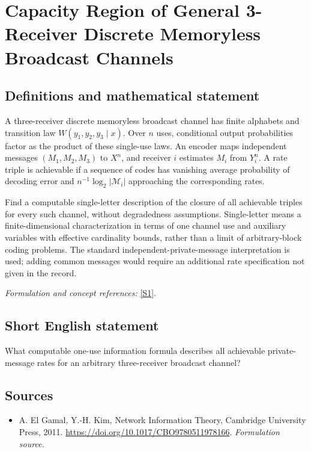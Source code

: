 \documentclass[11pt]{article}
\begin{document}
\section*{\texorpdfstring{Capacity Region of General 3-Receiver Discrete Memoryless Broadcast Channels}{Capacity Region of General 3-Receiver Discrete Memoryless Broadcast Channels}}\label{30006950}
\subsection{Definitions and mathematical statement}
A three-receiver discrete memoryless broadcast channel has finite alphabets and transition law $W(y_1,y_2,y_3\mid x)$. Over $n$ uses, conditional output probabilities factor as the product of these single-use laws. An encoder maps independent messages $(M_1,M_2,M_3)$ to $X^n$, and receiver $i$ estimates $M_i$ from $Y_i^n$. A rate triple is achievable if a sequence of codes has vanishing average probability of decoding error and $n^{-1}\log_2|\mathcal M_i|$ approaching the corresponding rates.

Find a computable single-letter description of the closure of all achievable triples for every such channel, without degradedness assumptions. Single-letter means a finite-dimensional characterization in terms of one channel use and auxiliary variables with effective cardinality bounds, rather than a limit of arbitrary-block coding problems. The standard independent-private-message interpretation is used; adding common messages would require an additional rate specification not given in the record.
\par\smallskip\textit{Formulation and concept references:} \href{https://doi.org/10.1017/CBO9780511978166}{[S1]}.

\subsection{Short English statement}
What computable one-use information formula describes all achievable private-message rates for an arbitrary three-receiver broadcast channel?
\subsection{Sources}
\begin{itemize}
\item[S1]A. El Gamal, Y.-H. Kim, Network Information Theory, Cambridge University Press, 2011.
\url{https://doi.org/10.1017/CBO9780511978166}.
\textit{Formulation source.}
\end{itemize}
\end{document}
